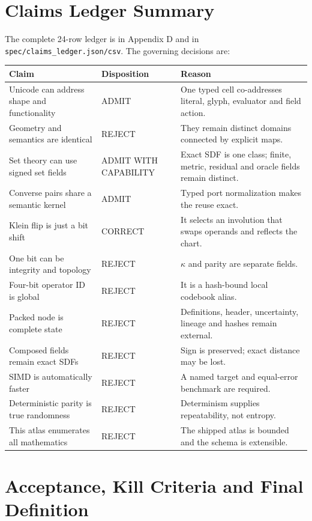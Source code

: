 \documentclass[11pt,a4paper]{article}
\begin{document}
\section{Claims Ledger Summary}
The complete 24-row ledger is in Appendix D and in \texttt{spec/claims\_ledger.json/csv}. The governing decisions are:

\begin{tabularx}{\textwidth}{P{50mm}P{31mm}Y}
\toprule
\textbf{Claim} & \textbf{Disposition} & \textbf{Reason}\\
\midrule
Unicode can address shape and functionality & ADMIT & One typed cell co-addresses literal, glyph, evaluator and field action.\\
Geometry and semantics are identical & REJECT & They remain distinct domains connected by explicit maps.\\
Set theory can use signed set fields & ADMIT WITH CAPABILITY & Exact SDF is one class; finite, metric, residual and oracle fields remain distinct.\\
Converse pairs share a semantic kernel & ADMIT & Typed port normalization makes the reuse exact.\\
Klein flip is just a bit shift & CORRECT & It selects an involution that swaps operands and reflects the chart.\\
One bit can be integrity and topology & REJECT & \(\kappa\) and parity are separate fields.\\
Four-bit operator ID is global & REJECT & It is a hash-bound local codebook alias.\\
Packed node is complete state & REJECT & Definitions, header, uncertainty, lineage and hashes remain external.\\
Composed fields remain exact SDFs & REJECT & Sign is preserved; exact distance may be lost.\\
SIMD is automatically faster & REJECT & A named target and equal-error benchmark are required.\\
Deterministic parity is true randomness & REJECT & Determinism supplies repeatability, not entropy.\\
This atlas enumerates all mathematics & REJECT & The shipped atlas is bounded and the schema is extensible.\\
\bottomrule
\end{tabularx}

\section{Acceptance, Kill Criteria and Final Definition}
\end{document}

